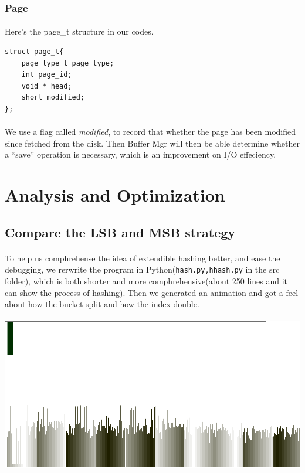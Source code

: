 \documentclass[a4paper, 12pt]{article}
\begin{document}
        \subsubsection{Page}
            \paragraph{}
                Here's the page\_t structure in our codes.
\begin{verbatim}
struct page_t{
    page_type_t page_type;
    int page_id;
    void * head;
    short modified;
};
\end{verbatim}
            \paragraph{}
                We use a flag called \emph{modified}, to record that whether the page has been modified since fetched from the disk. Then Buffer Mgr will then be able determine whether a ``save'' operation is necessary, which is an improvement on I/O effeciency.
\section{Analysis and Optimization}
    \subsection{Compare the LSB and MSB strategy}
        \paragraph{}
            To help us comphrehense the idea of extendible hashing better, and ease the debugging, we rerwrite the program in Python(\verb|hash.py,hhash.py| in the src folder), which is both shorter and more comphrehensive(about 250 lines and it can show the process of hashing). Then we generated an animation and got a feel about how the bucket split and how the index double.
        \paragraph{} \includegraphics[scale=0.4]{img/pic20000_l.png}
\end{document}
